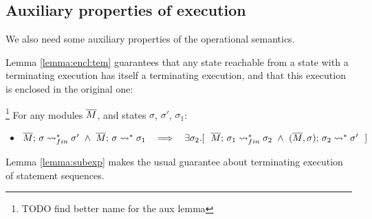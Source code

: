  
\subsection{Auxiliary properties of  execution} 





\label{sect:termExecs}
We also need some auxiliary properties of the operational semantics.
 
Lemma \ref{lemma:encl:tem} guarantees that any state reachable from a state with a terminating execution has itself a terminating execution, and that this execution is enclosed in the original one:
 
 \begin{auxLemma}\footnote{TODO find better name for the aux lemma}
 \label{lemma:encl:tem}
 For any modules $\overline{M}$,   and states $\sigma$, $\sigma'$, $\sigma_1$:
\begin{itemize}
\item
$  \leadstoBoundedStarFin {\Mtwo}  {\sigma}  {\sigma'} \  \wedge \  \leadstoBoundedStar  {\Mtwo}  {\sigma}  {\sigma_1} 
\ \ \  \Longrightarrow\ \ \  %
 \exists \sigma_2.[\ \ \leadstoBoundedStarFin {\Mtwo} {\sigma_1}  {\sigma_2}  
\ \wedge\ 
\leadstoBoundedStarThree  {\Mtwo}  {\sigma_2}  {\sigma}   {\sigma'} \ \ ]$
\end{itemize}

\end{auxLemma} 
 
Lemma \ref{lemma:subexp} makes the usual guarantee about terminating execution of statement sequences.
  
